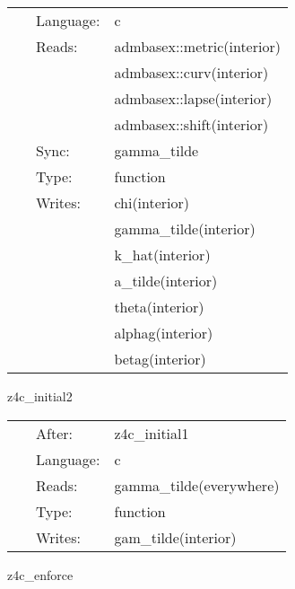  \begin{tabular*}{160mm}{cll} 
~ & Language:  & c \\ 
~ & Reads:  & admbasex::metric(interior) \\ 
~& ~ &admbasex::curv(interior)\\ 
~& ~ &admbasex::lapse(interior)\\ 
~& ~ &admbasex::shift(interior)\\ 
~ & Sync:  & gamma\_tilde \\ 
~ & Type:  & function \\ 
~ & Writes:  & chi(interior) \\ 
~& ~ &gamma\_tilde(interior)\\ 
~& ~ &k\_hat(interior)\\ 
~& ~ &a\_tilde(interior)\\ 
~& ~ &theta(interior)\\ 
~& ~ &alphag(interior)\\ 
~& ~ &betag(interior)\\ 
\end{tabular*} 


\vspace{5mm}


\hspace{5mm} z4c\_initial2 

\hspace{5mm}{\it convert adm to z4c variables, part 2 } 


\hspace{5mm}

 \begin{tabular*}{160mm}{cll} 
~ & After:  & z4c\_initial1 \\ 
~ & Language:  & c \\ 
~ & Reads:  & gamma\_tilde(everywhere) \\ 
~ & Type:  & function \\ 
~ & Writes:  & gam\_tilde(interior) \\ 
\end{tabular*} 


\vspace{5mm}


\hspace{5mm} z4c\_enforce 

\hspace{5mm}{\it enforce algebraic z4c constraints } 


